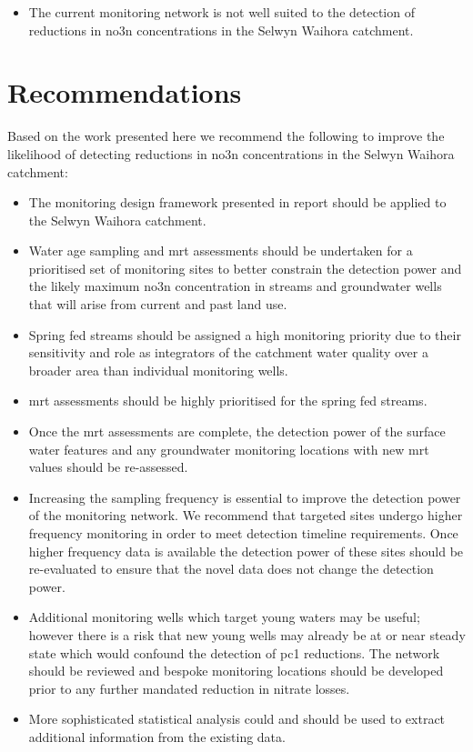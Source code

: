 \begin{itemize}
    \item The current monitoring network is not well suited to the detection of reductions in \gls{no3n} concentrations in the Selwyn Waihora catchment.
\end{itemize}

\section[Recommendations]{Recommendations} \label{sec:recommendations}

Based on the work presented here we recommend the following to improve the likelihood of detecting reductions in \gls{no3n} concentrations in the Selwyn Waihora catchment:
\begin{itemize}
    \item The monitoring design framework presented in \citet{olw_guidance} report should be applied to the Selwyn Waihora catchment. %
    \item Water age sampling and \gls{mrt} assessments should be undertaken for a prioritised set of monitoring sites to better constrain the detection power and the likely maximum \gls{no3n} concentration in streams and groundwater wells that will arise from current and past land use.
    \item Spring fed streams should be assigned a high monitoring priority due to their sensitivity and role as integrators of the catchment water quality over a broader area than individual monitoring wells.
    \item \gls{mrt} assessments should be highly prioritised for the spring fed streams.
    \item Once the \gls{mrt} assessments are complete, the detection power of the surface water features and any groundwater monitoring locations with new \gls{mrt} values should be re-assessed.
    \item Increasing the sampling frequency is essential to improve the detection power of the monitoring network. We recommend that targeted sites undergo higher frequency monitoring in order to meet detection timeline requirements. Once higher frequency data is available the detection power of these sites should be re-evaluated to ensure that the novel data does not change the detection power.
    \item Additional monitoring wells which target young waters may be useful; however there is a risk that new young wells may already be at or near steady state which would confound the detection of \gls{pc1} reductions. The network should be reviewed and bespoke monitoring locations should be developed prior to any further mandated reduction in nitrate losses.
    \item More sophisticated statistical analysis could and should be used to extract additional information from the existing data.
\end{itemize}